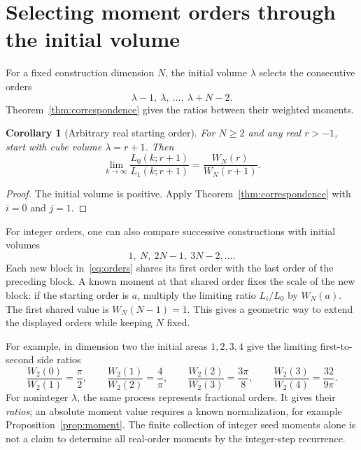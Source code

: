 \documentclass[11pt]{article}
\numberwithin{equation}{section}
\newtheorem{corollary}[theorem]{Corollary}
\theoremstyle{remark}
\begin{document}
\section{Selecting moment orders through the initial volume}
\label{sec:volume}

For a fixed construction dimension $N$, the initial volume $\lambda$
selects the consecutive orders
\begin{equation}
  \lambda-1,\ \lambda,\ \ldots,\ \lambda+N-2.
  \label{eq:orders}
\end{equation}
Theorem~\ref{thm:correspondence} gives the ratios between their
weighted moments.

\begin{corollary}[Arbitrary real starting order]
\label{cor:fractional}
For $N\geq2$ and any real $r>-1$, start with cube volume
$\lambda=r+1$. Then
\begin{equation}
  \lim_{k\to\infty}
    \frac{L_0(k;r+1)}{L_1(k;r+1)}
       =\frac{W_N(r)}{W_N(r+1)}.
  \label{eq:adjacent}
\end{equation}
\end{corollary}

\begin{proof}
The initial volume is positive. Apply
Theorem~\ref{thm:correspondence} with $i=0$ and $j=1$.
\end{proof}

For integer orders, one can also compare successive constructions
with initial volumes
\[
  1,\ N,\ 2N-1,\ 3N-2,\ldots.
\]
Each new block in~\eqref{eq:orders} shares its first order with
the last order of the preceding block. A known moment at that
shared order fixes the scale of the new block: if the starting
order is $a$, multiply the limiting ratio $L_i/L_0$ by $W_N(a)$.
The first shared value is $W_N(N-1)=1$.
This gives a geometric way to extend the displayed orders while
keeping $N$ fixed.

For example, in dimension two the initial areas $1,2,3,4$ give
the limiting first-to-second side ratios
\[
  \frac{W_2(0)}{W_2(1)}=\frac{\pi}{2},\qquad
  \frac{W_2(1)}{W_2(2)}=\frac4\pi,\qquad
  \frac{W_2(2)}{W_2(3)}=\frac{3\pi}{8},\qquad
  \frac{W_2(3)}{W_2(4)}=\frac{32}{9\pi}.
\]
For noninteger $\lambda$, the same process represents fractional
orders. It gives their \emph{ratios}; an absolute moment value
requires a known normalization, for example
Proposition~\ref{prop:moment}. The finite collection of integer
seed moments alone is not a claim to determine all real-order
moments by the integer-step recurrence.
\end{document}
